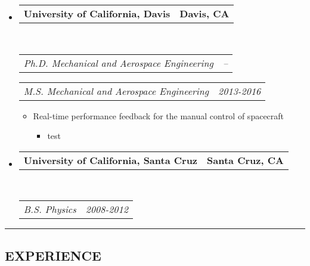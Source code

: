 \documentclass[letterpaper,MMMyyyy,nonstop]{simpleresumecv}
\makeatletter
\newcommand{\headerrow}[2]
{\begin{tabular*}{\linewidth}{l@{\extracolsep{\fill}}r}
    #1 &
    #2 \\
\end{tabular*}}
\makeatother
\begin{document}
\begin{itemize}
    \parskip=0.1em

    \item
          \headerrow
          {\textbf{University of California, Davis}}
          {\textbf{Davis, CA}}
          \\
          \headerrow
          {\emph{Ph.D. Mechanical and Aerospace Engineering}}
          {\emph{\DatestampYMD{2013}{09}{15} -- \DatestampYMD{2020}{09}{15}} }

          \headerrow
          {\emph{M.S. Mechanical and Aerospace Engineering}}
          {\emph{2013-2016}}
          \begin{itemize}
              \item Real-time performance feedback for the manual control of spacecraft
              \begin{itemize}
                \item test
              \end{itemize}
          \end{itemize}

    \item
          \headerrow
          {\textbf{University of California, Santa Cruz}}
          {\textbf{Santa Cruz, CA}}
          \\
          \headerrow
          {\emph{B.S. Physics}}
          {\emph{2008-2012}}
\end{itemize}


\hrule
\vspace{-0.4em}
\subsection*{EXPERIENCE}
\end{document}
